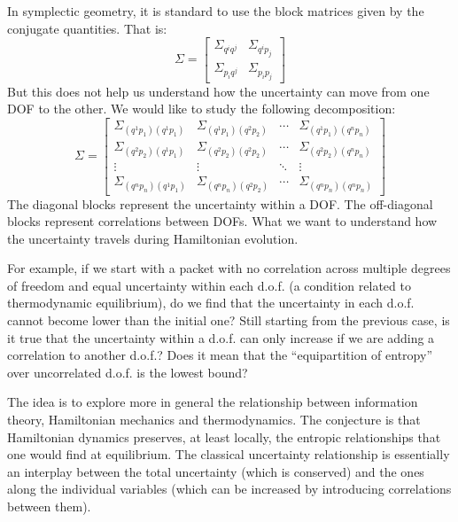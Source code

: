 In symplectic geometry, it is standard to use the block matrices given by the conjugate quantities. That is:
\begin{equation}
	\Sigma = \left[\begin{array}{cc}
		\Sigma_{q^i q^j} & \Sigma_{q^i p_j} \\
		\Sigma_{p_i q^j} & \Sigma_{p_i p_j} 
	\end{array} \right]
\end{equation}
But this does not help us understand how the uncertainty can move from one DOF to the other. We would like to study the following decomposition:
\begin{equation}
	\Sigma = \left[\begin{array}{cccc}
		\Sigma_{(q^1 p_1)(q^1 p_1)} & \Sigma_{(q^1 p_1)(q^2 p_2)} & \cdots & \Sigma_{(q^1 p_1)(q^n p_n)} \\
		\Sigma_{(q^2 p_2)(q^1 p_1)} & \Sigma_{(q^2 p_2)(q^2 p_2)} & \cdots & \Sigma_{(q^2 p_2)(q^n p_n)} \\
		\vdots & \vdots & \ddots & \vdots \\
		\Sigma_{(q^n p_n)(q^1 p_1)} & \Sigma_{(q^n p_n)(q^2 p_2)} & \cdots & \Sigma_{(q^n p_n)(q^n p_n)}
	\end{array} \right]
\end{equation}
The diagonal blocks represent the uncertainty within a DOF. The off-diagonal blocks represent correlations between DOFs. What we want to understand how the uncertainty travels during Hamiltonian evolution.

For example, if we start with a packet with no correlation across multiple degrees of freedom and equal uncertainty within each d.o.f. (a condition related to thermodynamic equilibrium), do we find that the uncertainty in each d.o.f. cannot become lower than the initial one?
Still starting from the previous case, is it true that the uncertainty within a d.o.f. can only increase if we are adding a correlation to another d.o.f.? Does it mean that the “equipartition of entropy” over uncorrelated d.o.f. is the lowest bound?

The idea is to explore more in general the relationship between information theory, Hamiltonian mechanics and thermodynamics. The conjecture is that Hamiltonian dynamics preserves, at least locally, the entropic relationships that one would find at equilibrium. The classical uncertainty relationship is essentially an interplay between the total uncertainty (which is conserved) and the ones along the individual variables (which can be increased by introducing correlations between them).

